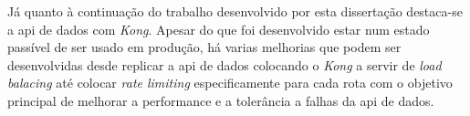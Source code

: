 Já quanto à continuação do trabalho desenvolvido por esta dissertação destaca-se a \acrshort{api} de dados com \textit{Kong}. Apesar do que foi desenvolvido estar num estado passível de ser usado em produção, há varias melhorias que podem ser desenvolvidas desde replicar a \acrshort{api} de dados colocando o \textit{Kong} a servir de \textit{load balacing} até colocar \textit{rate limiting} especificamente para cada rota com o objetivo principal de melhorar a performance e a tolerância a falhas da \acrshort{api} de dados.
